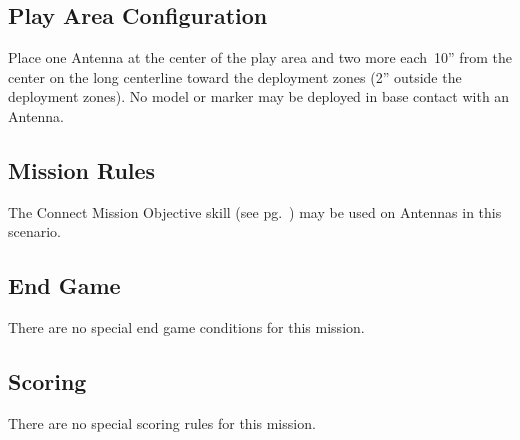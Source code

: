 \label{mission:seizetheantennas}

\subsection{Play Area Configuration}

Place one Antenna at the center of the play area and two more
each~10'' from the center on the long centerline toward the deployment
zones (2'' outside the deployment zones).  No model or marker may be
deployed in base contact with an Antenna.


\subsection{Mission Rules}

The Connect Mission Objective skill (see
pg.~\pageref{sec:hack-objective}) may be used on Antennas in this
scenario.


\subsection{End Game}

There are no special end game conditions for this mission.

\subsection{Scoring}

There are no special scoring rules for this mission.

